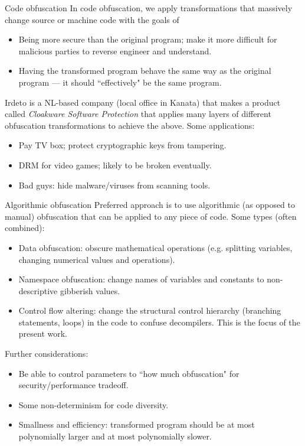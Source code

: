 \documentclass[10pt,handout]{beamer}
\theoremstyle{plain}
\theoremstyle{definition}
\begin{document}
\begin{frame}{Code obfuscation} %
	In code obfuscation, we apply transformations that massively change source or machine code with the goals of
    \begin{itemize}

        \item
        	Being more secure than the original program; make it more difficult for malicious parties to reverse engineer and understand.
        \item
        	Having the transformed program behave the same way as the original program --- it should ``effectively" be the same program.
    \end{itemize}
    \par \medskip \pause
    Irdeto is a NL-based company (local office in Kanata) that makes a product called \emph{Cloakware Software Protection} that applies many layers of different obfuscation transformations to achieve the above.  Some applications:
    \begin{itemize}
        \item
            Pay TV box; protect cryptographic keys from tampering.
        \item
            DRM for video games; likely to be broken eventually.
        \item
            Bad guys: hide malware/viruses from scanning tools.
    \end{itemize}
\end{frame}

\begin{frame}{Algorithmic obfuscation}
    Preferred approach is to use algorithmic (as opposed to manual) obfuscation that can be applied to any piece of code.  Some types (often combined):
    \begin{itemize}
        \item Data obfuscation: obscure mathematical operations (e.g. splitting variables, changing numerical values and operations).
        \item Namespace obfuscation: change names of variables and constants to non-descriptive gibberish values.
        \item Control flow altering: change the structural control hierarchy (branching statements, loops) in the code to confuse decompilers.  This is the focus of the present work.
    \end{itemize}\pause
    Further considerations:
    \begin{itemize}
        \item Be able to control parameters to ``how much obfuscation" for security/performance tradeoff.
        \item Some non-determinism for code diversity.
        \item Smallness and efficiency: transformed program should be at most polynomially larger and at most polynomially slower.
    \end{itemize}
\end{frame}
\end{document}
